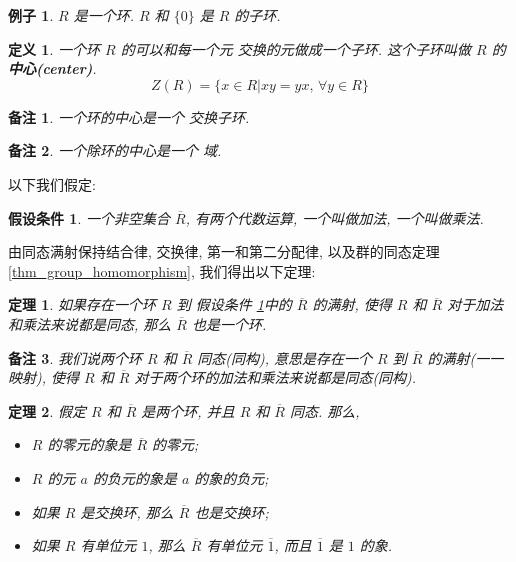 \documentclass[utf8]{ctexbook}
\newtheorem{theorem}{定理}[section]
\newtheorem{definition}{定义}[section]
\newtheorem{memo}{备注}[section]
\newtheorem{example}{例子}[section]
\newtheorem{assumption}{假设条件}[section]
\begin{document}
\begin{example}
$R$ 是一个环. $R$ 和 $\{ 0\}$ 是 $R$ 的子环.
\end{example}

\begin{definition}\label{def_ring_center}
一个环 $R$ 的可以和每一个元 交换的元做成一个子环. 这个子环叫做 $R$ 的 \textbf{中心(center)}.
\begin{equation}
Z(R) = \{ x \in R | xy = yx, \, \forall y \in R \}
\end{equation}
\end{definition}

\begin{memo}
一个环的中心是一个 交换子环.
\end{memo}

\begin{memo}
一个除环的中心是一个 域.
\end{memo}

以下我们假定:

\begin{assumption}\label{assumption_ring_set}
一个非空集合 $\overline{R}$, 有两个代数运算, 一个叫做加法, 一个叫做乘法.
\end{assumption}

由同态满射保持结合律, 交换律, 第一和第二分配律, 以及群的同态定理 \ref{thm_group_homomorphism}, 我们得出以下定理:

\begin{theorem}
如果存在一个环 $R$ 到 假设条件 \ref{assumption_ring_set}中的 $\overline{R}$ 的满射, 使得 $R$ 和 $\overline{R}$ 对于加法和乘法来说都是同态, 那么 $\overline{R}$ 也是一个环.
\end{theorem}

\begin{memo}
我们说两个环 $R$ 和 $\overline{R}$ 同态(同构), 意思是存在一个 $R$ 到 $\overline{R}$ 的满射(一一映射), 使得 $R$ 和 $\overline{R}$ 对于两个环的加法和乘法来说都是同态(同构).
\end{memo}

\begin{theorem}
假定 $R$ 和 $\overline{R}$ 是两个环, 并且 $R$ 和 $\overline{R}$ 同态. 那么, 
\begin{itemize}
\item{$R$ 的零元的象是 $\overline{R}$ 的零元;}
\item{$R$ 的元 $a$ 的负元的象是 $a$ 的象的负元;}
\item{如果 $R$ 是交换环, 那么 $\overline{R}$ 也是交换环;}
\item{如果 $R$ 有单位元 $1$, 那么 $\overline{R}$ 有单位元 $\overline{1}$, 而且 $\overline{1}$ 是 $1$ 的象.  }
\end{itemize}

\end{theorem}
\end{document}

